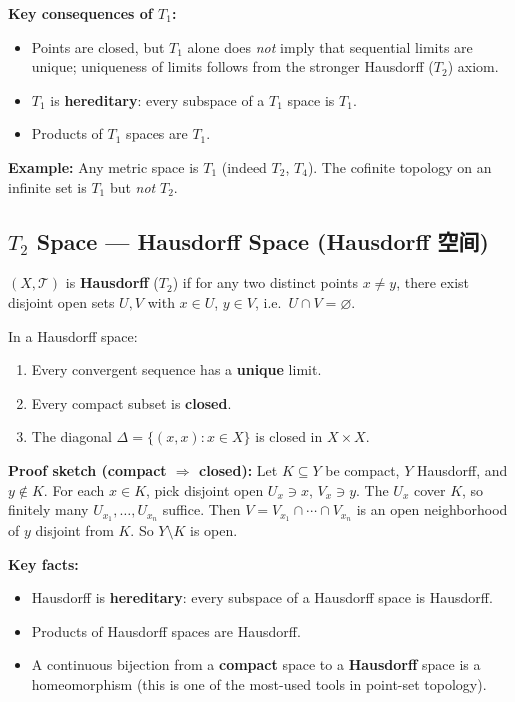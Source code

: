 \documentclass{article}
\begin{document}
\textbf{Key consequences of $T_1$:}
\begin{itemize}
  \item Points are closed, but $T_1$ alone does \emph{not} imply that
    sequential limits are unique; uniqueness of limits follows from the
    stronger Hausdorff ($T_2$) axiom.
  \item $T_1$ is \textbf{hereditary}: every subspace of a $T_1$ space is $T_1$.
  \item Products of $T_1$ spaces are $T_1$.
\end{itemize}

\textbf{Example:} Any metric space is $T_1$ (indeed $T_2$, $T_4$).
The cofinite topology on an infinite set is $T_1$ but \emph{not} $T_2$.

\subsection{$T_2$ Space --- Hausdorff Space (Hausdorff 空间)}\label{def:T2}
\begin{definition}
  $(X, \mathcal{T})$ is \textbf{Hausdorff} ($T_2$) if for any two distinct
  points $x \ne y$, there exist disjoint open sets $U, V$ with
  $x \in U$, $y \in V$, i.e.\ $U \cap V = \varnothing$.
\end{definition}

\begin{proposition}
  In a Hausdorff space:
  \begin{enumerate}
    \item Every convergent sequence has a \textbf{unique} limit.
    \item Every compact subset is \textbf{closed}.
    \item The diagonal $\Delta = \{(x,x) : x \in X\}$ is closed in $X \times X$.
  \end{enumerate}
\end{proposition}

\textbf{Proof sketch (compact $\Rightarrow$ closed):} Let $K \subseteq Y$ be
compact, $Y$ Hausdorff, and $y \notin K$. For each $x \in K$, pick disjoint
open $U_x \ni x$, $V_x \ni y$. The $U_x$ cover $K$, so finitely many
$U_{x_1}, \ldots, U_{x_n}$ suffice. Then $V = V_{x_1} \cap \cdots \cap V_{x_n}$
is an open neighborhood of $y$ disjoint from $K$. So $Y \setminus K$ is open.

\textbf{Key facts:}
\begin{itemize}
  \item Hausdorff is \textbf{hereditary}: every subspace of a
    Hausdorff space is Hausdorff.
  \item Products of Hausdorff spaces are Hausdorff.
  \item A continuous bijection from a \textbf{compact} space to a
    \textbf{Hausdorff} space is a homeomorphism
    (this is one of the most-used tools in point-set topology).
\end{itemize}
\end{document}
